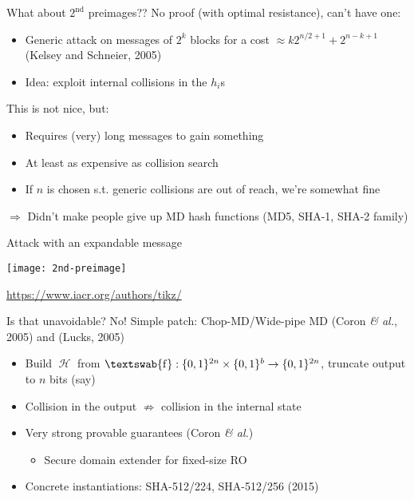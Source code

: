 \documentclass[xcolor=table,usenames,dvipsnames,compress]{beamer}
\newcommand\etal{\emph{\& al.}\xspace}
\DeclareMathOperator\hash{\mathcal{H}}
\DeclareMathOperator\cf{\textswab{f}}
\begin{document}
\begin{frame}{What about $2^\text{nd}$ preimages??}
No proof (with optimal resistance), can't have one:
\begin{itemize}
\item Generic attack on messages of $2^k$ blocks for a cost $\approx k 2^{n/2+1} + 2^{n-k+1}$ (Kelsey and Schneier, 2005)
\item Idea: exploit internal collisions in the $h_i$s
\end{itemize}
This is not nice, but:
\begin{itemize}
\item Requires (very) long messages to gain something
\item At least as expensive as collision search
\item If $n$ is chosen s.t. generic collisions are out of reach, we're somewhat fine
\end{itemize}
$\Rightarrow$ Didn't make people give up MD hash functions (MD5, SHA-1, SHA-2 family)
\end{frame}

\begin{frame}{Attack with an expandable message}

\begin{center}
\texttt{[image: 2nd-preimage]}
\end{center}

\bigskip

\url{https://www.iacr.org/authors/tikz/}
\end{frame}


\begin{frame}{Is that unavoidable?}
No! Simple patch: Chop-MD/Wide-pipe MD (Coron \etal, 2005) and (Lucks, 2005)
\begin{itemize}
\item Build $\hash$ from $\cf : \{0,1\}^{2n} \times \{0,1\}^b \rightarrow \{0,1\}^{2n}$, truncate output to $n$ bits (say)
\item Collision in the output $\nRightarrow$ collision in the internal state
\item Very strong provable guarantees (Coron \etal)
\begin{itemize}
\item Secure domain extender for fixed-size RO
\end{itemize}
\item Concrete instantiations: SHA-512/224, SHA-512/256 (2015)
\end{itemize}
\end{frame}
\end{document}
